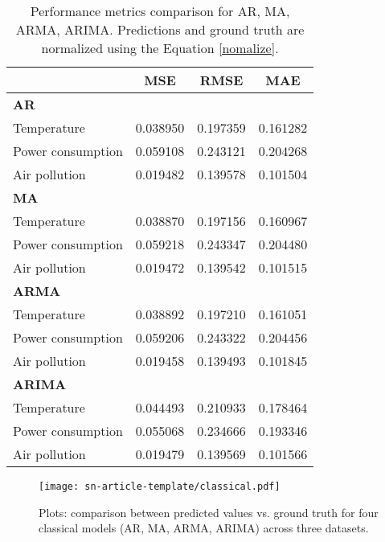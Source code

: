 \documentclass[sn-mathphys-num]{sn-jnl}
\theoremstyle{thmstyleone}%
\theoremstyle{thmstyletwo}%
\theoremstyle{thmstylethree}%
\begin{document}
\begin{table}[]
\centering
\begin{tabular}{@{}lccc@{}}
\toprule
\textbf{}               & \textbf{MSE} & \textbf{RMSE} & \textbf{MAE} \\ \midrule
\textbf{AR}             &              &               &              \\
Temperature             & 0.038950     & 0.197359      & 0.161282     \\
Power consumption       & 0.059108     & 0.243121      & 0.204268     \\
Air pollution           & 0.019482     & 0.139578      & 0.101504     \\ \midrule
\textbf{MA}             &              &               &              \\
Temperature             & 0.038870     & 0.197156      & 0.160967    \\
Power consumption       & 0.059218     & 0.243347      & 0.204480     \\
Air pollution           & 0.019472     & 0.139542      & 0.101515     \\ \midrule
\textbf{ARMA}           &              &               &              \\
Temperature             & 0.038892     & 0.197210      & 0.161051     \\
Power consumption       & 0.059206     & 0.243322      & 0.204456     \\
Air pollution           & 0.019458     & 0.139493      & 0.101845      \\ \midrule
\textbf{ARIMA}          &              &               &              \\
Temperature             & 0.044493     & 0.210933      & 0.178464     \\
Power consumption       & 0.055068     & 0.234666      & 0.193346     \\
Air pollution           & 0.019479     & 0.139569      & 0.101566       \\ \bottomrule
\end{tabular}
\caption{Performance metrics comparison for AR, MA, ARMA, ARIMA. Predictions and ground truth are normalized using the Equation \ref{nomalize}.}
\label{tab:classical_metric}
\end{table}

\begin{figure}[]
	\begin{center}
		\texttt{[image: sn-article-template/classical.pdf]}
	\end{center}
	\caption{Plots: comparison between predicted values vs. ground truth for four classical models (AR, MA, ARMA, ARIMA) across three datasets.}
	\label{fig:classical_perf}
\end{figure}
\end{document}
